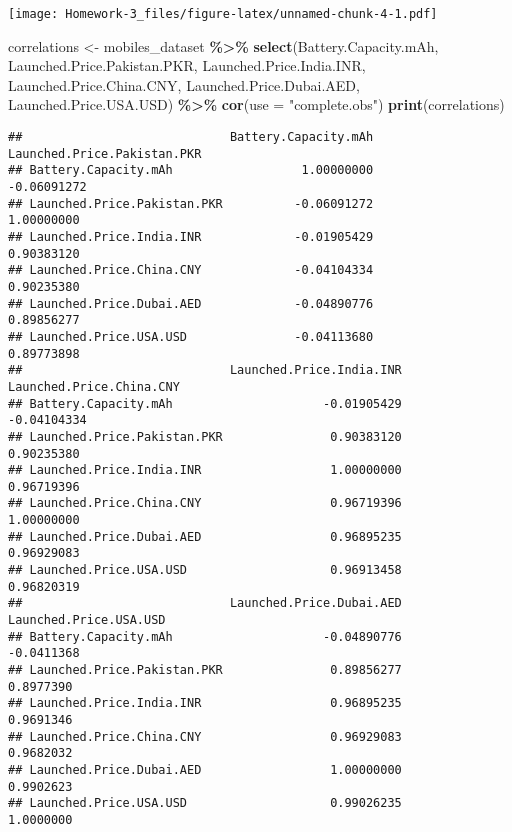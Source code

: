 \documentclass[
]{article}
\newenvironment{Shaded}{\begin{snugshade}}{\end{snugshade}}
\newcommand{\AttributeTok}[1]{\textcolor[rgb]{0.13,0.29,0.53}{#1}}
\newcommand{\FunctionTok}[1]{\textcolor[rgb]{0.13,0.29,0.53}{\textbf{#1}}}
\newcommand{\NormalTok}[1]{#1}
\newcommand{\OtherTok}[1]{\textcolor[rgb]{0.56,0.35,0.01}{#1}}
\newcommand{\SpecialCharTok}[1]{\textcolor[rgb]{0.81,0.36,0.00}{\textbf{#1}}}
\newcommand{\StringTok}[1]{\textcolor[rgb]{0.31,0.60,0.02}{#1}}
\begin{document}
\texttt{[image: Homework-3\_files/figure-latex/unnamed-chunk-4-1.pdf]}

\begin{Shaded}
\begin{Highlighting}[]
\NormalTok{correlations }\OtherTok{\textless{}{-}}\NormalTok{ mobiles\_dataset }\SpecialCharTok{\%\textgreater{}\%} 
  \FunctionTok{select}\NormalTok{(Battery.Capacity.mAh, Launched.Price.Pakistan.PKR,  Launched.Price.India.INR, Launched.Price.China.CNY, Launched.Price.Dubai.AED, }\StringTok{\textasciigrave{}}\AttributeTok{Launched.Price.USA.USD}\StringTok{\textasciigrave{}}\NormalTok{) }\SpecialCharTok{\%\textgreater{}\%} 
  \FunctionTok{cor}\NormalTok{(}\AttributeTok{use =} \StringTok{"complete.obs"}\NormalTok{)}
\FunctionTok{print}\NormalTok{(correlations)}
\end{Highlighting}
\end{Shaded}

\begin{verbatim}
##                             Battery.Capacity.mAh Launched.Price.Pakistan.PKR
## Battery.Capacity.mAh                  1.00000000                 -0.06091272
## Launched.Price.Pakistan.PKR          -0.06091272                  1.00000000
## Launched.Price.India.INR             -0.01905429                  0.90383120
## Launched.Price.China.CNY             -0.04104334                  0.90235380
## Launched.Price.Dubai.AED             -0.04890776                  0.89856277
## Launched.Price.USA.USD               -0.04113680                  0.89773898
##                             Launched.Price.India.INR Launched.Price.China.CNY
## Battery.Capacity.mAh                     -0.01905429              -0.04104334
## Launched.Price.Pakistan.PKR               0.90383120               0.90235380
## Launched.Price.India.INR                  1.00000000               0.96719396
## Launched.Price.China.CNY                  0.96719396               1.00000000
## Launched.Price.Dubai.AED                  0.96895235               0.96929083
## Launched.Price.USA.USD                    0.96913458               0.96820319
##                             Launched.Price.Dubai.AED Launched.Price.USA.USD
## Battery.Capacity.mAh                     -0.04890776             -0.0411368
## Launched.Price.Pakistan.PKR               0.89856277              0.8977390
## Launched.Price.India.INR                  0.96895235              0.9691346
## Launched.Price.China.CNY                  0.96929083              0.9682032
## Launched.Price.Dubai.AED                  1.00000000              0.9902623
## Launched.Price.USA.USD                    0.99026235              1.0000000
\end{verbatim}
\end{document}
